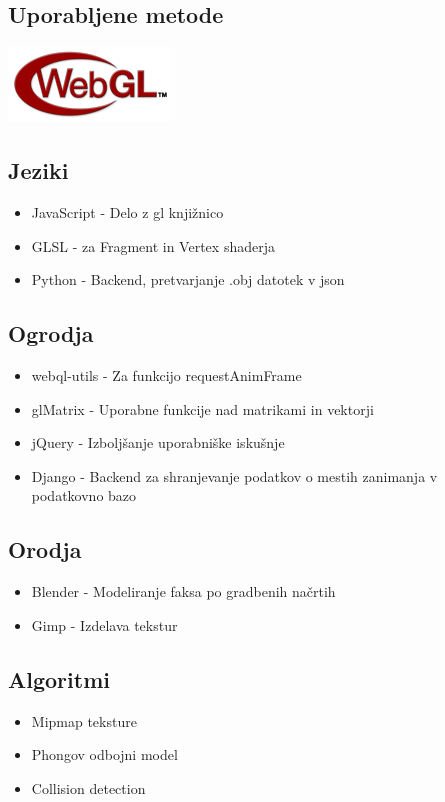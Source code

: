 \documentclass[10pt,a4paper]{article}
\begin{document}
\subsection{Uporabljene metode}
\begin{center}
\includegraphics{./WebGL.png}
\end{center}
\subsection*{Jeziki}
\begin{itemize}
	\item JavaScript - Delo z gl knjižnico
	\item GLSL - za Fragment in Vertex shaderja
	\item Python - Backend, pretvarjanje .obj datotek v json
\end{itemize}
\subsection*{Ogrodja}
\begin{itemize}
	\item webql-utils - Za funkcijo requestAnimFrame
	\item glMatrix - Uporabne funkcije nad matrikami in vektorji
	\item jQuery - Izboljšanje uporabniške iskušnje
	\item Django - Backend za shranjevanje podatkov o mestih zanimanja v podatkovno bazo 
\end{itemize}
\subsection*{Orodja}
\begin{itemize}
	\item Blender - Modeliranje faksa po gradbenih načrtih
	\item Gimp - Izdelava tekstur
\end{itemize}
\subsection*{Algoritmi}
\begin{itemize}
	\item Mipmap teksture
	\item Phongov odbojni model
	\item Collision detection
\end{itemize}
\pagebreak
\end{document}
